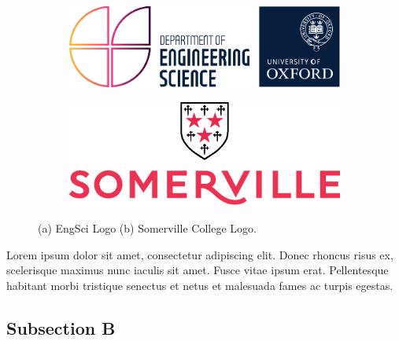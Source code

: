     \par\begin{minipage}{\linewidth}
        \centering
        \begin{figure}[H]%
            \centering%
            \captionsetup[subfigure]{aboveskip=5pt,belowskip=5pt}%
            \centering%
            \begin{subfigure}[b]{0.45\textwidth}%
                \includegraphics[width=\textwidth]{Images/CH2/EngLogo_PlaceHolder}%
                \label{fig:ch2.f1a}%
            \end{subfigure}%
            \hspace{40pt}%
            \begin{subfigure}[b]{0.45\textwidth}%
                \includegraphics[width=\textwidth]{Images/CH2/SomervilleLogo_PlaceHolder}%
                \subcaption{}%
                \label{fig:ch2.f1b}%
            \end{subfigure}%
            \caption{(a) EngSci Logo (b) Somerville College Logo.}\label{fig:ch2.f1}%
        \end{figure}
    \end{minipage}%
    \par\noindent Lorem ipsum dolor sit amet, consectetur adipiscing elit. Donec rhoncus risus ex, scelerisque maximus nunc iaculis sit amet. Fusce vitae ipsum erat. Pellentesque habitant morbi tristique senectus et netus et malesuada fames ac turpis egestas.
    \par\subsection{Subsection B}\label{sec:ch2.sec1.subsec2}
